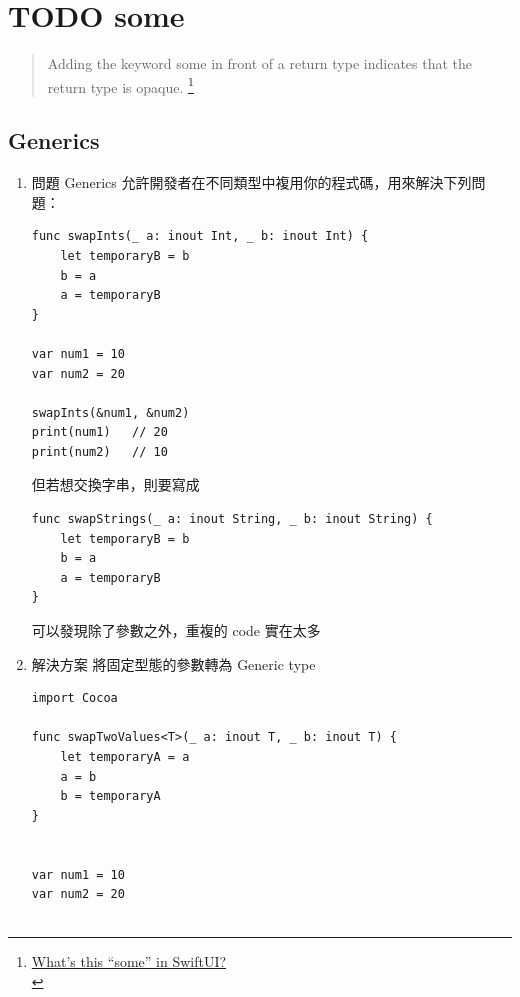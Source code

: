 \documentclass[a4paper,12pt]{article}
\begin{document}
\section{{\bfseries\sffamily TODO} some}
\label{some}
\begin{verse}
Adding the keyword some in front of a return type indicates that the return type is opaque. \footnote{\href{https://medium.com/@PhiJay/whats-this-some-in-swiftui-34e2c126d4c4}{What’s this “some” in SwiftUI?}\\}\\
\end{verse}
\subsection{Generics}
\label{sec:org7e90e70}
\begin{enumerate}
\item 問題
\label{sec:org50377fd}
Generics 允許開發者在不同類型中複用你的程式碼，用來解決下列問題：\\
\lstset{breaklines=true,language=swift,label= ,caption= ,captionpos=b,firstnumber=1,numbers=left}
\begin{lstlisting}
func swapInts(_ a: inout Int, _ b: inout Int) {
    let temporaryB = b
    b = a
    a = temporaryB
}

var num1 = 10
var num2 = 20

swapInts(&num1, &num2)
print(num1)   // 20
print(num2)   // 10
\end{lstlisting}
但若想交換字串，則要寫成\\
\lstset{breaklines=true,language=swift,label= ,caption= ,captionpos=b,firstnumber=1,numbers=left}
\begin{lstlisting}
func swapStrings(_ a: inout String, _ b: inout String) {
    let temporaryB = b
    b = a
    a = temporaryB
}
\end{lstlisting}
可以發現除了參數之外，重複的 code 實在太多\\
\item 解決方案
\label{sec:org553ed31}
將固定型態的參數轉為 Generic type\\
\lstset{breaklines=true,language=swift,label= ,caption= ,captionpos=b,firstnumber=1,numbers=left}
\begin{lstlisting}
import Cocoa

func swapTwoValues<T>(_ a: inout T, _ b: inout T) {
    let temporaryA = a
    a = b
    b = temporaryA
}


var num1 = 10
var num2 = 20


\end{lstlisting}
\end{enumerate}
\end{document}
